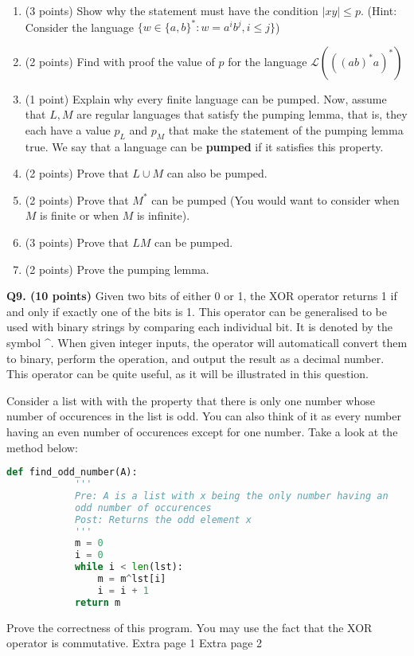 \documentclass{article}
\begin{document}
    \begin{enumerate}[label=\alph*)]
        \item (3 points) Show why the statement must have the condition \(|xy| \leq p\). (Hint: Consider the language \(\{w \in \{a, b\}^* : w = a^i b^j , i \leq j\}\))
        \vfill
        \item (2 points) Find with proof the value of \(p\) for the language \(\mathcal{L}(((ab)^*a)^*)\) 
        \vfill
        \item (1 point) Explain why every finite language can be pumped.
        \vfill
        \pagebreak
        Now, assume that \(L,M\) are regular languages that satisfy the pumping lemma, that is, they each have a value \(p_L\) and \(p_M\) that make the statement of the pumping lemma true. We say that a language can be \textbf{pumped} if it satisfies this property.
        
        \item (2 points) Prove that \(L \cup M\) can also be pumped.
        \vfill
        \item (2 points) Prove that \(M^*\) can be pumped (You would want to consider when \(M\) is finite or when \(M\) is infinite).
        \vfill
        \pagebreak
        \item (3 points) Prove that \(LM\) can be pumped.
        \vfill
        \item (2 points) Prove the pumping lemma.
        \vfill
    \end{enumerate}

    \pagebreak

    \textbf{Q9. (10 points)} Given two bits of either 0 or 1, the XOR operator returns 1 if and only if exactly one of the bits is 1. This operator can be generalised to be used with binary strings by comparing each individual bit. It is denoted by the symbol \^{}. When given integer inputs, the operator will automaticall convert them to binary, perform the operation, and output the result as a decimal number. This operator can be quite useful, as it will be illustrated in this question.

    Consider a list with with the property that there is only one number whose number of occurences in the list is odd. You can also think of it as every number having an even number of occurences except for one number. Take a look at the method below:

    \begin{lstlisting}[language=Python]
        def find_odd_number(A):
            '''
            Pre: A is a list with x being the only number having an
            odd number of occurences
            Post: Returns the odd element x
            '''
            m = 0
            i = 0
            while i < len(lst):
                m = m^lst[i]
                i = i + 1
            return m
    \end{lstlisting}

    \noindent Prove the correctness of this program. You may use the fact that the XOR operator is commutative.
    \vfill
    \newpage
    Extra page 1
    \newpage
    Extra page 2
\end{document}

